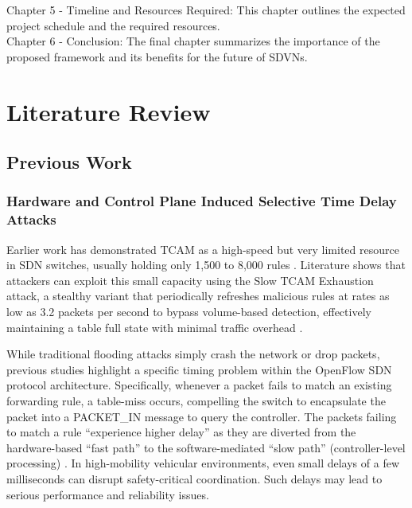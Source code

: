 \documentclass[12pt, a4paper]{report}
\begin{document}
Chapter 5 - Timeline and Resources Required:
This chapter outlines the expected project schedule and the required resources.
\\

Chapter 6 - Conclusion:
The final chapter summarizes the importance of the proposed framework and its benefits for the future of SDVNs.


\chapter{Literature Review}
\section{Previous Work}

\subsection{Hardware and Control Plane Induced Selective Time Delay Attacks}

Earlier work has demonstrated TCAM as a high-speed but very limited resource in SDN switches, usually holding only 1,500 to 8,000 rules \cite{PASCOAL2020107223}. Literature shows that attackers can exploit this small capacity using the Slow TCAM Exhaustion attack, a stealthy variant that periodically refreshes malicious rules at rates as low as 3.2 packets per second to bypass volume-based detection, effectively maintaining a table full state with minimal traffic overhead \cite{PASCOAL2020107223} \cite{pascoal2017slow}. 

While traditional flooding attacks simply crash the network or drop packets, previous studies highlight a specific timing problem within the OpenFlow SDN protocol architecture. Specifically, whenever a packet fails to match an existing forwarding rule, a table-miss occurs, compelling the switch to encapsulate the packet into a PACKET\_IN message to query the controller\cite{PASCOAL2020107223}. The packets failing to match a rule ``experience higher delay'' as they are diverted from the hardware-based ``fast path'' to the software-mediated ``slow path'' (controller-level processing) \cite{9356082} \cite{7929710}. In high-mobility vehicular environments, even small delays of a few milliseconds can disrupt safety-critical coordination. Such delays may lead to serious performance and reliability issues.
\end{document}
